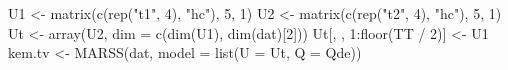 \begin{Schunk}
\begin{Sinput}
 U1 <- matrix(c(rep("t1", 4), "hc"), 5, 1)
 U2 <- matrix(c(rep("t2", 4), "hc"), 5, 1)
 Ut <- array(U2, dim = c(dim(U1), dim(dat)[2]))
 Ut[, , 1:floor(TT / 2)] <- U1
 kem.tv <- MARSS(dat, model = list(U = Ut, Q = Qde))
\end{Sinput}
\end{Schunk}
